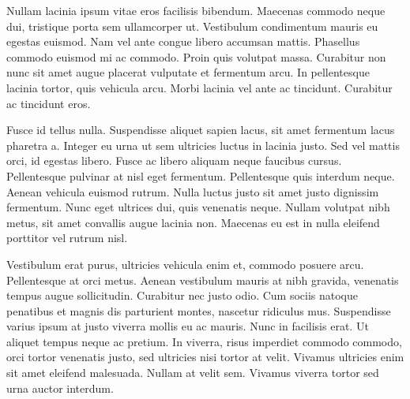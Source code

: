 Nullam lacinia ipsum vitae eros facilisis bibendum. Maecenas commodo neque dui, tristique porta sem ullamcorper ut. Vestibulum condimentum mauris eu egestas euismod. Nam vel ante congue libero accumsan mattis. Phasellus commodo euismod mi ac commodo. Proin quis volutpat massa. Curabitur non nunc sit amet augue placerat vulputate et fermentum arcu. In pellentesque lacinia tortor, quis vehicula arcu. Morbi lacinia vel ante ac tincidunt. Curabitur ac tincidunt eros.

Fusce id tellus nulla. Suspendisse aliquet sapien lacus, sit amet fermentum lacus pharetra a. Integer eu urna ut sem ultricies luctus in lacinia justo. Sed vel mattis orci, id egestas libero. Fusce ac libero aliquam neque faucibus cursus. Pellentesque pulvinar at nisl eget fermentum. Pellentesque quis interdum neque. Aenean vehicula euismod rutrum. Nulla luctus justo sit amet justo dignissim fermentum. Nunc eget ultrices dui, quis venenatis neque. Nullam volutpat nibh metus, sit amet convallis augue lacinia non. Maecenas eu est in nulla eleifend porttitor vel rutrum nisl.

Vestibulum erat purus, ultricies vehicula enim et, commodo posuere arcu. Pellentesque at orci metus. Aenean vestibulum mauris at nibh gravida, venenatis tempus augue sollicitudin. Curabitur nec justo odio. Cum sociis natoque penatibus et magnis dis parturient montes, nascetur ridiculus mus. Suspendisse varius ipsum at justo viverra mollis eu ac mauris. Nunc in facilisis erat. Ut aliquet tempus neque ac pretium. In viverra, risus imperdiet commodo commodo, orci tortor venenatis justo, sed ultricies nisi tortor at velit. Vivamus ultricies enim sit amet eleifend malesuada. Nullam at velit sem. Vivamus viverra tortor sed urna auctor interdum. 